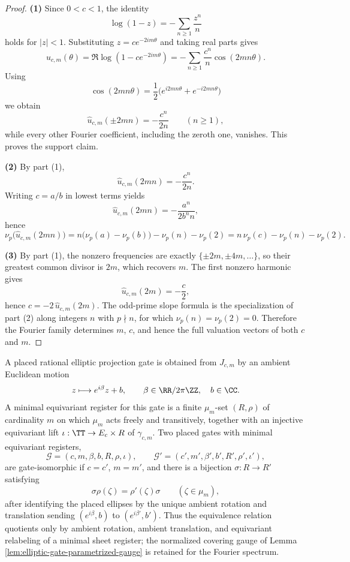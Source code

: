 \begin{proof}
\textbf{(1)} Since \(0<c<1\), the identity
\[
\log(1-z)=-\sum_{n\ge 1}\frac{z^n}{n}
\]
holds for \(|z|<1\). Substituting \(z=c e^{-2im\theta}\) and taking real parts gives
\[
u_{c,m}(\theta)=\Re\log(1-c e^{-2im\theta})
=-\sum_{n\ge 1}\frac{c^n}{n}\cos(2mn\theta).
\]
Using
\[
\cos(2mn\theta)=\frac12\bigl(e^{i2mn\theta}+e^{-i2mn\theta}\bigr)
\]
we obtain
\[
\widehat u_{c,m}(\pm 2mn)=-\frac{c^n}{2n}
\qquad (n\ge 1),
\]
while every other Fourier coefficient, including the zeroth one, vanishes. This proves the support claim.

\textbf{(2)} By part (1),
\[
\widehat u_{c,m}(2mn)=-\frac{c^n}{2n}.
\]
Writing \(c=a/b\) in lowest terms yields
\[
\widehat u_{c,m}(2mn)=-\frac{a^n}{2b^n n},
\]
hence
\[
\nu_p\!\bigl(\widehat u_{c,m}(2mn)\bigr)
=n\bigl(\nu_p(a)-\nu_p(b)\bigr)-\nu_p(n)-\nu_p(2)
=n\,\nu_p(c)-\nu_p(n)-\nu_p(2).
\]

\textbf{(3)} By part (1), the nonzero frequencies are exactly \(\{\pm 2m,\pm 4m,\ldots\}\), so their greatest common divisor is \(2m\), which recovers \(m\). The first nonzero harmonic gives
\[
\widehat u_{c,m}(2m)=-\frac{c}{2},
\]
hence \(c=-2\,\widehat u_{c,m}(2m)\). The odd-prime slope formula is the specialization of part (2) along integers \(n\) with \(p\nmid n\), for which \(\nu_p(n)=\nu_p(2)=0\). Therefore the Fourier family determines \(m\), \(c\), and hence the full valuation vectors of both \(c\) and \(m\).
\end{proof}

\begin{definition}\label{def:equivariant-elliptic-gate-isomorphism}
A placed rational elliptic projection gate is obtained from \(J_{c,m}\) by an ambient Euclidean motion
\[
z\longmapsto e^{i\beta}z+b,
\qquad \beta\in\RR/2\pi\ZZ,
\quad b\in\CC.
\]
A minimal equivariant register for this gate is a finite \(\mu_m\)-set \((R,\rho)\) of cardinality \(m\) on which \(\mu_m\) acts freely and transitively, together with an injective equivariant lift \(\iota:\TT\to E_c\times R\) of \(\gamma_{c,m}\).  Two placed gates with minimal equivariant registers,
\[
\mathcal G=(c,m,\beta,b,R,\rho,\iota),
\qquad
\mathcal G'=(c',m',\beta',b',R',\rho',\iota'),
\]
are gate-isomorphic if \(c=c'\), \(m=m'\), and there is a bijection \(\sigma:R\to R'\) satisfying
\[
\sigma\rho(\zeta)=\rho'(\zeta)\sigma
\qquad(\zeta\in\mu_m),
\]
after identifying the placed ellipses by the unique ambient rotation and translation sending \((e^{i\beta},b)\) to \((e^{i\beta'},b')\).  Thus the equivalence relation quotients only by ambient rotation, ambient translation, and equivariant relabeling of a minimal sheet register; the normalized covering gauge of Lemma \ref{lem:elliptic-gate-parametrized-gauge} is retained for the Fourier spectrum.
\end{definition}

